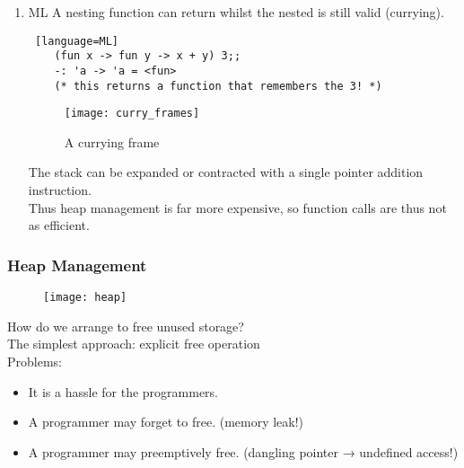 \documentclass[../../lecture_notes.tex]{subfiles}
\begin{document}
\begin{enumerate} [itemsep=0mm]
		To make this work, functions are represented by a pair of pointers
			\begin{enumerate} [itemsep=0mm]
				\item a pointer to the code (ip)
				\item a pointer to the defining frame (op)
			\end{enumerate}

		A function is thus an (ip, op) pair.\\
		These pointers are called FAT, since they hold two words as opposed to thin C pointers.\\
		This is how continuations work!

	\item ML
	A nesting function can return whilst the nested is still valid (currying).
		\begin{lstlisting} [language=ML]
	(fun x -> fun y -> x + y) 3;;
	-: 'a -> 'a = <fun>
	(* this returns a function that remembers the 3! *)
		\end{lstlisting}

	\begin{figure}[H]
		\centering
		\texttt{[image: curry\_frames]}
		\caption{A currying frame}
		\label{fig:test}
	\end{figure}

\noindent The stack can be expanded or contracted with a single pointer addition instruction.\\
Thus heap management is far more expensive, so function calls are thus not as efficient.
\end{enumerate}

\subsubsection*{Heap Management}

\begin{figure}[H]
	\centering
	\texttt{[image: heap]}
	\caption{}
	\label{fig:test}
\end{figure}

How do we arrange to free unused storage?\\
The simplest approach: explicit free operation\\
	\indent Problems:
	\begin{itemize} [itemsep=0mm]
		\item It is a hassle for the programmers.
		\item A programmer may forget to free. (memory leak!)
		\item A programmer may preemptively free. (dangling pointer → undefined access!)
	\end{itemize}
\end{document}
